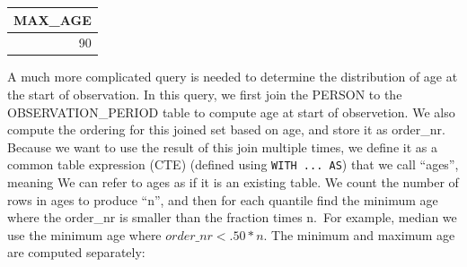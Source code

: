 \documentclass[11pt]{book}
\theoremstyle{definition}
\theoremstyle{definition}
\theoremstyle{definition}
\theoremstyle{remark}
\begin{document}
\begin{longtable}[]{@{}r@{}}
\toprule
MAX\_AGE\tabularnewline
\midrule
\endhead
90\tabularnewline
\bottomrule
\end{longtable}

A much more complicated query is needed to determine the distribution of age at the start of observation. In this query, we first join the PERSON to the OBSERVATION\_PERIOD table to compute age at start of observetion. We also compute the ordering for this joined set based on age, and store it as order\_nr. Because we want to use the result of this join multiple times, we define it as a common table expression (CTE) (defined using \texttt{WITH\ ...\ AS}) that we call ``ages'', meaning We can refer to ages as if it is an existing table. We count the number of rows in ages to produce ``n'', and then for each quantile find the minimum age where the order\_nr is smaller than the fraction times n.~For example, median we use the minimum age where \(order\_nr < .50 * n\). The minimum and maximum age are computed separately:
\end{document}

